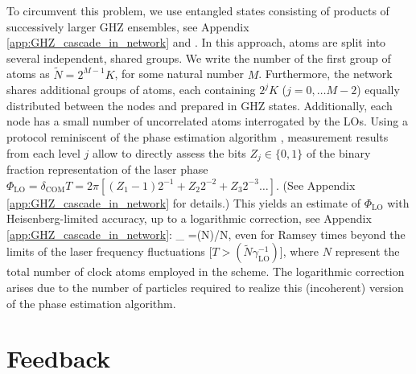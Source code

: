 To circumvent this problem, we use entangled states consisting of products of
successively larger GHZ ensembles, see Appendix \ref{app:GHZ_cascade_in_network} and 
\cite{Kessler2014}. In this approach, 
atoms are split into
several independent, shared groups.
We write the number of the first group of atoms as $\tilde N =2^{M-1} K$, for
some natural number $M$.
Furthermore, the network shares additional groups of atoms, each containing
$2^{j} K$ ($j=0, \hdots M-2$) equally distributed between the nodes and prepared
in GHZ states. 
Additionally, each node has a small number of uncorrelated atoms interrogated by
the LOs. Using a protocol reminiscent of the phase estimation algorithm
\cite{Kessler2014,Nielsen_Chuang, Giedke2006}, measurement results from each
level $j$ allow to directly assess the bits $Z_j \in \{0,1\}$ of the binary
fraction representation of the laser phase $\Phi_\mathrm{LO}=\delta_\mathrm{COM} T
=2\pi [(Z_1-1) 2^{-1} + Z_2 2^{-2} + Z_3 2^{-3} \hdots]$.
(See Appendix \ref{app:GHZ_cascade_in_network} for details.)
This
yields an estimate of $\Phi_\mathrm{LO}$ with Heisenberg-limited accuracy, up to a
logarithmic correction, see Appendix \ref{app:GHZ_cascade_in_network}:
\bel 
	\Delta \Phi_ =\log(N)/N,
	\label{eq2}
\eel 
even for Ramsey times beyond the limits of the laser frequency fluctuations [$T
> (\tilde N\gamma_\mathrm{LO}^{-1})$], where $N$ represent the total number of
clock atoms employed in the scheme. The logarithmic correction arises due to the
number of particles required to realize this (incoherent) version of the phase
estimation algorithm.

\section{Feedback}

